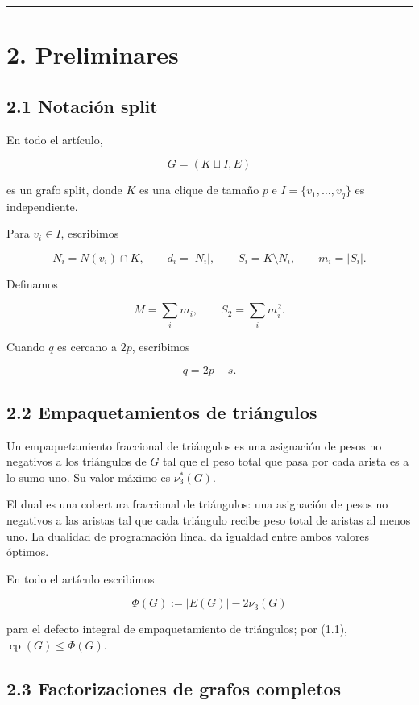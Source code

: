 \documentclass[
  spanish,
  11pt,
  a4paper,
]{article}
\begin{document}
\begin{center}\rule{0.5\linewidth}{0.5pt}\end{center}

\section{2. Preliminares}\label{preliminares}

\subsection{2.1 Notación split}\label{notaciuxf3n-split}

En todo el artículo,

\[
G=(K\sqcup I,E)
\]

es un grafo split, donde \(K\) es una clique de tamaño \(p\) e \(I=\{v_1,\ldots,v_q\}\) es independiente.

Para \(v_i\in I\), escribimos

\[
N_i=N(v_i)\cap K,
\qquad
d_i=|N_i|,
\qquad
S_i=K\setminus N_i,
\qquad
m_i=|S_i|.
\]

Definamos

\[
M=\sum_i m_i,
\qquad
S_2=\sum_i m_i^2.
\]

Cuando \(q\) es cercano a \(2p\), escribimos

\[
q=2p-s.
\tag{2.1}
\]

\subsection{2.2 Empaquetamientos de triángulos}\label{empaquetamientos-de-triuxe1ngulos}

Un empaquetamiento fraccional de triángulos es una asignación de pesos no negativos a los triángulos de \(G\) tal que el peso total que pasa por cada arista es a lo sumo uno. Su valor máximo es \(\nu_3^*(G)\).

El dual es una cobertura fraccional de triángulos: una asignación de pesos no negativos a las aristas tal que cada triángulo recibe peso total de aristas al menos uno. La dualidad de programación lineal da igualdad entre ambos valores óptimos.

En todo el artículo escribimos

\[
\Phi(G):=|E(G)|-2\nu_3(G)
\]

para el defecto integral de empaquetamiento de triángulos; por (1.1), \(\operatorname{cp}(G)\le\Phi(G)\).

\subsection{2.3 Factorizaciones de grafos completos}\label{factorizaciones-de-grafos-completos}
\end{document}
